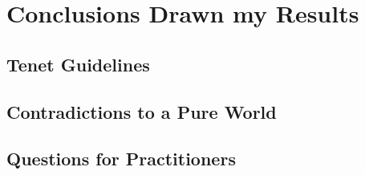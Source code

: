 \section{Conclusions Drawn my Results}

\subsection{\ms{} Tenet Guidelines}

\subsection{Contradictions to a Pure \ms{} World}

\subsection{Questions for Practitioners}